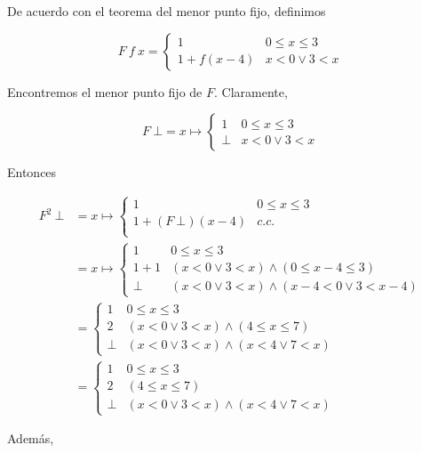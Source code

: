\documentclass[a4paper, 12pt]{article}
\begin{document}
De acuerdo con el teorema del menor punto fijo, definimos 

\begin{equation*}
  F ~ f ~ x = \begin{cases}
    1 & 0 \leq x \leq 3 \\ 
    1 + f(x - 4) & x < 0 \lor 3 < x
  \end{cases}
\end{equation*}

Encontremos el menor punto fijo de $F$. Claramente, 

\begin{equation*}
  F ~ \bot = x \mapsto \begin{cases}
    1 & 0 \leq x \leq 3 \\ 
    \bot & x <0 \lor  3 < x
  \end{cases}
\end{equation*}

Entonces 

\begin{align*}
  F^2 ~ \bot 
  &= x\mapsto \begin{cases}
    1 & 0 \leq x \leq 3 \\ 
    1 + (F~\bot)(x-4) & c.c. \\ 
  \end{cases}\\
&=x\mapsto \begin{cases}
  1 & 0\leq x \leq 3 \\ 
  1 + 1 & (x < 0 \lor  3 < x) \land  (0 \leq x - 4 \leq 3) \\ 
  \bot & (x < 0 \lor 3 < x) \land (x-4 < 0 \lor 3 < x - 4)
\end{cases} \\ 
&=\begin{cases}
  1 & 0 \leq x \leq 3 \\ 
  2 & (x < 0 \lor  3 < x) \land  (4 \leq x \leq 7) \\ 
  \bot & (x < 0 \lor  3 < x) \land (x<4 \lor 7 < x)
\end{cases}\\
&=\begin{cases}
  1 & 0 \leq x \leq 3 \\ 
  2 & (4 \leq x \leq 7) \\ 
  \bot & (x < 0 \lor  3 < x) \land (x<4 \lor 7 < x)
\end{cases}
\end{align*}

Además, 
\end{document}
